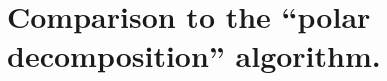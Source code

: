 \documentclass{lms}
\makeatletter
\def\transpose#1{{\vphantom{#1}}^{\mathrm{t}}\!#1}
\def\mat#1{\begin{pmatrix}#1\end{pmatrix}}
\def\clap #1{\hbox to 0pt{\hss#1\hss}}
\def\stretchdots#1#2#3#4{
  \setbox0=\hbox{$#4$}\dimen0= \wd0 \advance \dimen0 2\arraycolsep
  \rlap{\kern -\arraycolsep \hbox to \dimen0 {%
  \hss \raise #1 \clap{$.$}\hss
  \hss \raise #2 \clap{$\m@th.$}\hss
  \hss \raise #3 \clap{$\m@th.$}\hss}}%
  \kern \wd0
}
\def\sddots{\stretchdots{8pt}{4pt}{0pt}}
\makeatother
\begin{document}
% 
% 
% 
% 
% 

\appendix
\section{Comparison to the ``polar decomposition'' algorithm.}
\label{ap:polar}
\end{document}
